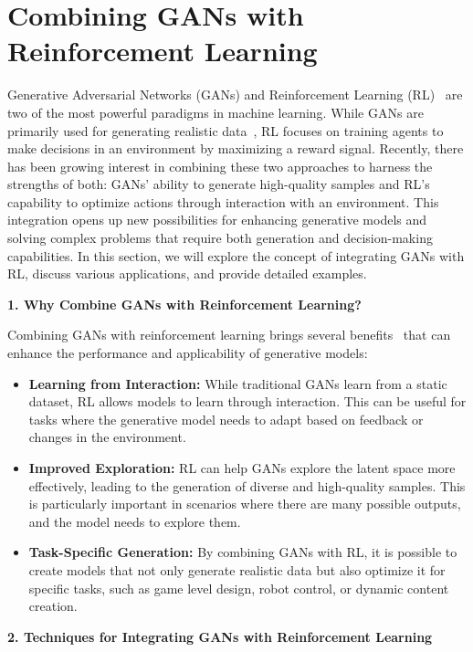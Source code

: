 \section{Combining GANs with Reinforcement Learning}
Generative Adversarial Networks (GANs) and Reinforcement Learning (RL)~\cite{sutton1998reinforcement, sutton2018reinforcement} are two of the most powerful paradigms in machine learning. While GANs are primarily used for generating realistic data~\cite{kaelbling1996reinforcement}, RL focuses on training agents to make decisions in an environment by maximizing a reward signal. Recently, there has been growing interest in combining these two approaches to harness the strengths of both: GANs' ability to generate high-quality samples and RL's capability to optimize actions through interaction with an environment. This integration opens up new possibilities for enhancing generative models and solving complex problems that require both generation and decision-making capabilities. In this section, we will explore the concept of integrating GANs with RL, discuss various applications, and provide detailed examples.

\textbf{1. Why Combine GANs with Reinforcement Learning?}

Combining GANs with reinforcement learning brings several benefits~\cite{wiering2012reinforcement} that can enhance the performance and applicability of generative models:
\begin{itemize}
    \item \textbf{Learning from Interaction:} While traditional GANs learn from a static dataset, RL allows models to learn through interaction. This can be useful for tasks where the generative model needs to adapt based on feedback or changes in the environment.
    \item \textbf{Improved Exploration:} RL can help GANs explore the latent space more effectively, leading to the generation of diverse and high-quality samples. This is particularly important in scenarios where there are many possible outputs, and the model needs to explore them.
    \item \textbf{Task-Specific Generation:} By combining GANs with RL, it is possible to create models that not only generate realistic data but also optimize it for specific tasks, such as game level design, robot control, or dynamic content creation.
\end{itemize}

\textbf{2. Techniques for Integrating GANs with Reinforcement Learning}

